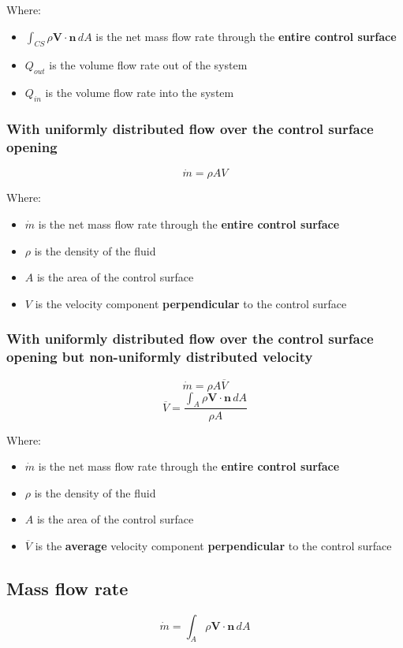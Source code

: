 \documentclass[11pt]{article}
\begin{document}
Where:
\begin{itemize}
\item \(\int_{CS} \rho \boldsymbol{V} \cdot \boldsymbol{n} \, dA\) is the net mass flow rate through the \textbf{entire control surface}
\item \(Q_{out}\) is the volume flow rate out of the system
\item \(Q_{in}\) is the volume flow rate into the system
\end{itemize}

\subsubsection{With uniformly distributed flow over the control surface opening}
\label{sec:orge142f61}
\[\dot{m} = \rho A V\]

Where:
\begin{itemize}
\item \(\dot{m}\) is the net mass flow rate through the \textbf{entire control surface}
\item \(\rho\) is the density of the fluid
\item \(A\) is the area of the control surface
\item \(V\) is the velocity component \textbf{perpendicular} to the control surface
\end{itemize}

\subsubsection{With uniformly distributed flow over the control surface opening but non-uniformly distributed velocity}
\label{sec:org2dde1df}
\[\dot{m} = \rho A \overline{V}\]
\[\overline{V} = \frac{\int_A \rho \boldsymbol{V} \cdot \boldsymbol{n} \, dA}{\rho A}\]

Where:
\begin{itemize}
\item \(\dot{m}\) is the net mass flow rate through the \textbf{entire control surface}
\item \(\rho\) is the density of the fluid
\item \(A\) is the area of the control surface
\item \(\overline{V}\) is the \textbf{average} velocity component \textbf{perpendicular} to the control surface
\end{itemize}

\subsection{Mass flow rate}
\label{sec:org591b98e}
\[\dot{m} = \int_A \rho \boldsymbol{V} \cdot \boldsymbol{n} \, dA\]
\end{document}
